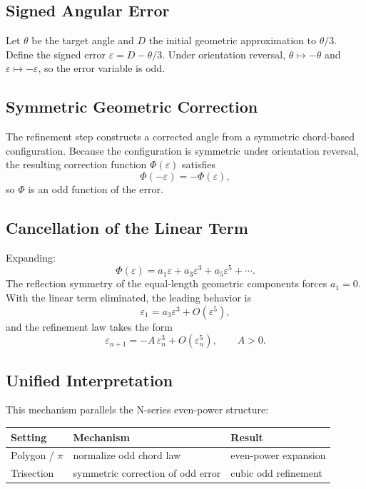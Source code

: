 \documentclass[12pt]{article}
\theoremstyle{remark}
\begin{document}
\subsection{Signed Angular Error}

Let $\theta$ be the target angle and $D$ the initial geometric approximation
to $\theta/3$. Define the signed error $\varepsilon = D - \theta/3$. Under
orientation reversal, $\theta \mapsto -\theta$ and $\varepsilon \mapsto -\varepsilon$,
so the error variable is odd.

\subsection{Symmetric Geometric Correction}

The refinement step constructs a corrected angle from a symmetric chord-based
configuration. Because the configuration is symmetric under orientation reversal,
the resulting correction function $\Phi(\varepsilon)$ satisfies
\[
  \Phi(-\varepsilon) = -\Phi(\varepsilon),
\]
so $\Phi$ is an odd function of the error.

\subsection{Cancellation of the Linear Term}

Expanding:
\[
  \Phi(\varepsilon) = a_1\varepsilon + a_3\varepsilon^3 + a_5\varepsilon^5 + \cdots.
\]
The reflection symmetry of the equal-length geometric components forces
$a_1 = 0$. With the linear term eliminated, the leading behavior is
\[
  \varepsilon_1 = a_3\varepsilon^3 + O(\varepsilon^5),
\]
and the refinement law takes the form
\[
  \varepsilon_{n+1} = -A\,\varepsilon_n^3 + O(\varepsilon_n^5),
  \qquad A > 0.
\]

\subsection{Unified Interpretation}

This mechanism parallels the N-series even-power structure:

\begin{center}
\begin{tabular}{lll}
\hline
\textbf{Setting} & \textbf{Mechanism} & \textbf{Result} \\
\hline
Polygon / $\pi$ & normalize odd chord law & even-power expansion \\
Trisection & symmetric correction of odd error & cubic odd refinement \\
\hline
\end{tabular}
\end{center}
\end{document}
